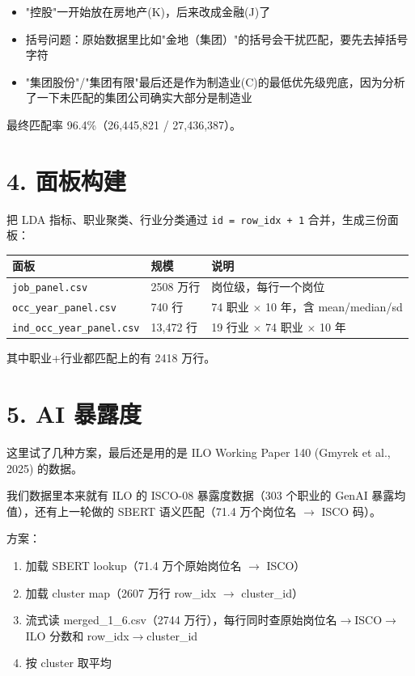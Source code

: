\documentclass[12pt,a4paper]{article}
\begin{document}
\begin{itemize}
  \item "控股"一开始放在房地产(K)，后来改成金融(J)了
  \item 括号问题：原始数据里比如"金地（集团）"的括号会干扰匹配，要先去掉括号字符
  \item "集团股份"/"集团有限"最后还是作为制造业(C)的最低优先级兜底，因为分析了一下未匹配的集团公司确实大部分是制造业
\end{itemize}

最终匹配率 96.4\%（26,445,821 / 27,436,387）。

\bigskip

\section*{4. 面板构建}

把 LDA 指标、职业聚类、行业分类通过 \texttt{id = row\_idx + 1} 合并，生成三份面板：

\begin{center}
\small
\begin{tabular}{llp{7cm}}
\toprule
面板 & 规模 & 说明 \\
\midrule
\texttt{job\_panel.csv} & 2508 万行 & 岗位级，每行一个岗位 \\
\texttt{occ\_year\_panel.csv} & 740 行 & 74 职业 $\times$ 10 年，含 mean/median/sd \\
\texttt{ind\_occ\_year\_panel.csv} & 13{,}472 行 & 19 行业 $\times$ 74 职业 $\times$ 10 年 \\
\bottomrule
\end{tabular}
\end{center}

其中职业+行业都匹配上的有 2418 万行。

\bigskip

\section*{5. AI 暴露度}

这里试了几种方案，最后还是用的是 ILO Working Paper 140 (Gmyrek et al., 2025) 的数据。

我们数据里本来就有 ILO 的 ISCO-08 暴露度数据（303 个职业的 GenAI 暴露均值），还有上一轮做的 SBERT 语义匹配（71.4 万个岗位名 $\rightarrow$ ISCO 码）。

方案： 
\begin{enumerate}
  \item 加载 SBERT lookup（71.4 万个原始岗位名 $\rightarrow$ ISCO）
  \item 加载 cluster map（2607 万行 row\_idx $\rightarrow$ cluster\_id）
  \item 流式读 merged\_1\_6.csv（2744 万行），每行同时查原始岗位名$\rightarrow$ISCO$\rightarrow$ILO 分数和 row\_idx$\rightarrow$cluster\_id
  \item 按 cluster 取平均
\end{enumerate}
\end{document}
